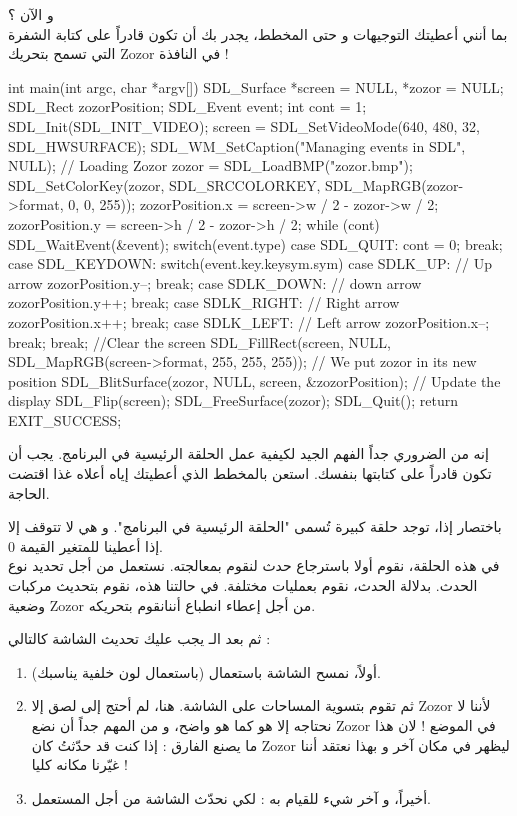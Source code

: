 و الآن ؟\\
بما أنني أعطيتك التوجيهات و حتى المخطط، يجدر بك أن تكون قادراً على كتابة الشفرة التي تسمح بتحريك
\textenglish{Zozor}
في النافذة !
\begin{Csource}
int main(int argc, char *argv[])
{
	SDL_Surface *screen = NULL, *zozor = NULL;
	SDL_Rect zozorPosition;
	SDL_Event event;
	int cont = 1;
	SDL_Init(SDL_INIT_VIDEO);
	screen = SDL_SetVideoMode(640, 480, 32, SDL_HWSURFACE);
	SDL_WM_SetCaption("Managing events in SDL", NULL);
	// Loading Zozor
	zozor = SDL_LoadBMP("zozor.bmp");
	SDL_SetColorKey(zozor, SDL_SRCCOLORKEY, SDL_MapRGB(zozor->format, 0, 0, 255));
	zozorPosition.x = screen->w / 2 - zozor->w / 2;
	zozorPosition.y = screen->h / 2 - zozor->h / 2;
	while (cont)
	{
		SDL_WaitEvent(&event);
		switch(event.type)
		{
			case SDL_QUIT:
			cont = 0;
			break;
			case SDL_KEYDOWN:
			switch(event.key.keysym.sym)
			{
				case SDLK_UP: // Up arrow
				zozorPosition.y--;
				break;
				case SDLK_DOWN: // down arrow
				zozorPosition.y++;
				break;
				case SDLK_RIGHT: // Right arrow
				zozorPosition.x++;
				break;
				case SDLK_LEFT: // Left arrow
				zozorPosition.x--;
				break;
			}
			break;
		}
		//Clear the screen
		SDL_FillRect(screen, NULL, SDL_MapRGB(screen->format, 255, 255, 255));
		// We put zozor in its new position
		SDL_BlitSurface(zozor, NULL, screen, &zozorPosition);
		// Update the display
		SDL_Flip(screen);
	}
	SDL_FreeSurface(zozor);
	SDL_Quit();
	return EXIT_SUCCESS;
}
\end{Csource}

إنه من الضروري جداً الفهم الجيد لكيفية عمل الحلقة الرئيسية في البرنامج. يجب أن تكون قادراً على كتابتها بنفسك. استعن بالمخطط الذي أعطيتك إياه أعلاه غذا اقتضت الحاجة.

باختصار إذا، توجد حلقة كبيرة تُسمى "الحلقة الرئيسية في البرنامج". و هي لا تتوقف إلا إذا أعطينا للمتغير 
القيمة 0.\\
في هذه الحلقة، نقوم أولا باسترجاع حدث لنقوم بمعالجته. نستعمل 
من أجل تحديد نوع الحدث. بدلالة الحدث، نقوم بعمليات مختلفة. في حالتنا هذه، نقوم بتحديث مركبات وضعية
\textenglish{Zozor}
من أجل إعطاء انطباع أننانقوم بتحريكه.

ثم بعد الـ
يجب عليك تحديث الشاشة كالتالي :

\begin{enumerate}
	\item أولاً، نمسح الشاشة باستعمال
	(باستعمال لون خلفية يناسبك).
	\item ثم تقوم بتسوية المساحات على الشاشة. هنا، لم أحتج إلى لصق إلا
	\textenglish{Zozor}
	لأننا لا نحتاجه إلا هو كما هو واضح، و من المهم جداً أن نضع
	\textenglish{Zozor}
	في الموضع
	 !
	لان هذا ما يصنع الفارق : إذا كنت قد حدّثتُ
	كان
	\textenglish{Zozor}
	ليظهر في مكان آخر و بهذا نعتقد أننا غيّرنا مكانه كليا !
	\item أخيراً، و آخر شيء للقيام به :
	لكي نحدّث الشاشة من أجل المستعمل.
\end{enumerate}

